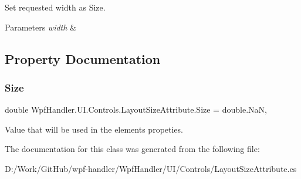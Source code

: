 Set requested width as Size. 


\begin{DoxyParams}{Parameters}
{\em width} & \\
\hline
\end{DoxyParams}


\subsection{Property Documentation}
\mbox{\label{class_wpf_handler_1_1_u_i_1_1_controls_1_1_layout_size_attribute_a3cf68aa208cfd09f789773f844683f87}} 
\subsubsection{\texorpdfstring{Size}{Size}}
{\footnotesize\ttfamily double Wpf\+Handler.\+U\+I.\+Controls.\+Layout\+Size\+Attribute.\+Size = double.\+NaN\hspace{0.3cm}{\ttfamily [get]}, {\ttfamily [set]}}



Value that will be used in the element\textquotesingle{}s propeties. 



The documentation for this class was generated from the following file\+:\begin{DoxyCompactItemize}
\item 
D\+:/\+Work/\+Git\+Hub/wpf-\/handler/\+Wpf\+Handler/\+U\+I/\+Controls/Layout\+Size\+Attribute.\+cs\end{DoxyCompactItemize}
